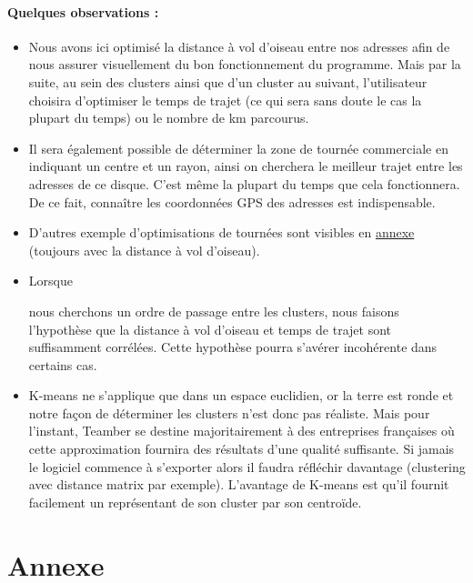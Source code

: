 \documentclass[12pt]{article}
\begin{document}
\paragraph{Quelques observations :}
\begin{itemize}

\item Nous avons ici optimisé la distance à vol d'oiseau entre nos adresses afin de nous assurer visuellement du bon fonctionnement du programme. Mais par la suite, au sein des clusters ainsi que d'un cluster au suivant, l'utilisateur choisira d'optimiser le temps de trajet (ce qui sera sans doute le cas la plupart du temps) ou le nombre de km parcourus.

\item Il sera également possible de déterminer la zone de tournée commerciale en indiquant un centre et un rayon, ainsi on cherchera le meilleur trajet entre les adresses de ce disque. C'est même la plupart du temps que cela fonctionnera. De ce fait, connaître les coordonnées GPS des adresses est indispensable.

\item D'autres exemple d'optimisations de tournées sont visibles en \hyperlink{Ref1}{annexe} (toujours avec la distance à vol d'oiseau). 

\item \hypertarget{Ref2}{Lorsque} nous cherchons un ordre de passage entre les clusters, nous faisons l'hypothèse que la distance à vol d'oiseau et temps de trajet sont  suffisamment corrélées. Cette hypothèse pourra s'avérer incohérente dans certains cas.

\item K-means ne s'applique que dans un espace euclidien, or la terre est ronde et notre façon de déterminer les clusters n'est donc pas réaliste. Mais pour l'instant, Teamber se destine majoritairement à des entreprises françaises où cette approximation fournira des résultats d'une qualité suffisante. Si jamais le logiciel commence à s'exporter alors il faudra réfléchir davantage (clustering avec distance matrix par exemple). L'avantage de K-means est qu'il fournit facilement un représentant de son cluster par son centroïde.

\end{itemize}





\newpage
\section{Annexe}
\end{document}
